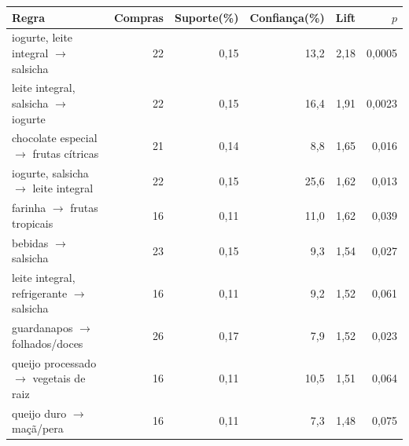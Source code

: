 \begin{tabularx}{\textwidth}{XrRRrr}
\toprule
Regra & Compras & Suporte\newline(\%) & Confiança\newline(\%) & Lift & $p$ \\
\midrule
iogurte, leite integral $\rightarrow$ salsicha & 22 & 0,15 & 13,2 & 2,18 & 0,0005 \\
leite integral, salsicha $\rightarrow$ iogurte & 22 & 0,15 & 16,4 & 1,91 & 0,0023 \\
chocolate especial $\rightarrow$ frutas cítricas & 21 & 0,14 & 8,8 & 1,65 & 0,016 \\
iogurte, salsicha $\rightarrow$ leite integral & 22 & 0,15 & 25,6 & 1,62 & 0,013 \\
farinha $\rightarrow$ frutas tropicais & 16 & 0,11 & 11,0 & 1,62 & 0,039 \\
bebidas $\rightarrow$ salsicha & 23 & 0,15 & 9,3 & 1,54 & 0,027 \\
leite integral, refrigerante $\rightarrow$ salsicha & 16 & 0,11 & 9,2 & 1,52 & 0,061 \\
guardanapos $\rightarrow$ folhados/doces & 26 & 0,17 & 7,9 & 1,52 & 0,023 \\
queijo processado $\rightarrow$ vegetais de raiz & 16 & 0,11 & 10,5 & 1,51 & 0,064 \\
queijo duro $\rightarrow$ maçã/pera & 16 & 0,11 & 7,3 & 1,48 & 0,075 \\
\bottomrule
\end{tabularx}
